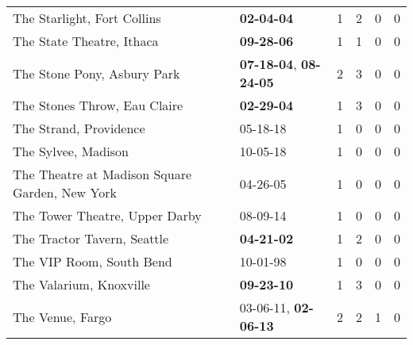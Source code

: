 \begin{longtable}{p{}p{}p{}p{}p{}p{}}
                                                  The Starlight, Fort Collins &                                       \textbf{02-04-04\textsuperscript{}} &  1 &  2 &  0 &  0 \\
                                                    The State Theatre, Ithaca &                                       \textbf{09-28-06\textsuperscript{}} &  1 &  1 &  0 &  0 \\
                                                  The Stone Pony, Asbury Park &  \textbf{07-18-04\textsuperscript{}}, \textbf{08-24-05\textsuperscript{}} &  2 &  3 &  0 &  0 \\
                                                 The Stones Throw, Eau Claire &                                       \textbf{02-29-04\textsuperscript{}} &  1 &  3 &  0 &  0 \\
                                                       The Strand, Providence &                                                05-18-18\textsuperscript{} &  1 &  0 &  0 &  0 \\
                                                          The Sylvee, Madison &                                                10-05-18\textsuperscript{} &  1 &  0 &  0 &  0 \\
                               The Theatre at Madison Square Garden, New York &                                                04-26-05\textsuperscript{} &  1 &  0 &  0 &  0 \\
                                               The Tower Theatre, Upper Darby &                                                08-09-14\textsuperscript{} &  1 &  0 &  0 &  0 \\
                                                  The Tractor Tavern, Seattle &                                       \textbf{04-21-02\textsuperscript{}} &  1 &  2 &  0 &  0 \\
                                                     The VIP Room, South Bend &                                                10-01-98\textsuperscript{} &  1 &  0 &  0 &  0 \\
                                                      The Valarium, Knoxville &                                       \textbf{09-23-10\textsuperscript{}} &  1 &  3 &  0 &  0 \\
                                                             The Venue, Fargo &           03-06-11\textsuperscript{}, \textbf{02-06-13\textsuperscript{}} &  2 &  2 &  1 &  0 \\

\end{longtable}
